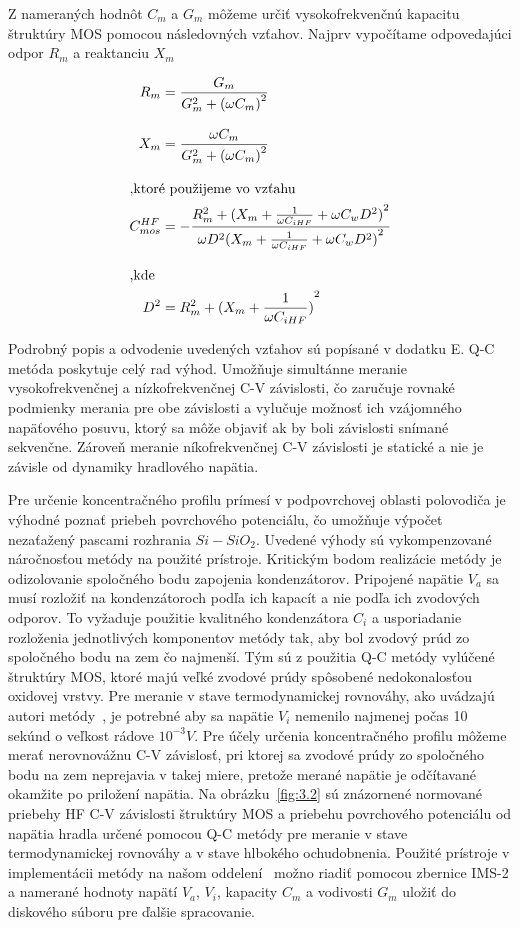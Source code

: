 Z nameraných hodnôt $C_m$ a $G_m$ môžeme určiť vysokofrekvenčnú
kapacitu štruktúry MOS pomocou následovných vzťahov.  Najprv
vypočítame odpovedajúci odpor $R_m$ a reaktanciu $X_m$

\begin{subequations}\label{eq:3.3}
  \begin{align}
    R_m &= \frac{G_m}{G^2_m + {(\omega C_m)}^2}\label{eq:3.3a}\\[0.3cm]
    X_m &= \frac{\omega C_m}{G^2_m + {(\omega C_m)}^2}\label{eq:3.3b}\\[0.3cm]
    \intertext{,ktoré použijeme vo vzťahu}
    C^{HF}_{mos} &= - \cfrac{R^2_m + {(X_m + \frac{1}{\omega C_{iHF}} + \omega C_w D^2)}^2}{\omega D^2{(X_m + \frac{1}{\omega C_{iHF}} + \omega C_{w} D^2)}^2}\label{eq:3.3c}\\[0.3cm]
    \intertext{,kde}
    D^2 &= R^2_m + {(X_m + \frac{1}{\omega C_{iHF}})}^2\label{eq:3.3d}
  \end{align}
\end{subequations}

Podrobný popis a odvodenie uvedených vzťahov sú popísané v dodatku
E\@. Q-C metóda poskytuje celý rad výhod.  Umožňuje simultánne meranie
vysokofrekvenčnej a nízkofrekvenčnej C-V závislosti, čo zaručuje
rovnaké podmienky merania pre obe závislosti a vylučuje možnosť ich
vzájomného napäťového posuvu, ktorý sa môže objaviť ak by boli
závislosti snímané sekvenčne. Zároveň meranie níkofrekvenčnej C-V
závislosti je statické a nie je závisle od dynamiky hradlového
napätia.

Pre určenie koncentračného profilu prímesí v podpovrchovej oblasti
polovodiča je výhodné poznať priebeh povrchového potenciálu, čo
umožňuje výpočet nezaťažený pascami rozhrania $Si-SiO_2$. Uvedené
výhody sú vykompenzované náročnosťou metódy na použité prístroje.
Kritickým bodom realizácie metódy je odizolovanie spoločného bodu
zapojenia kondenzátorov. Pripojené napätie $V_a$ sa musí rozložiť na
kondenzátoroch podľa ich kapacít a nie podľa ich zvodových odporov.
To vyžaduje použitie kvalitného kondenzátora $C_i$ a usporiadanie
rozloženia jednotlivých komponentov metódy tak, aby bol zvodový prúd
zo spoločného bodu na zem čo najmenší. Tým sú z použitia Q-C metódy
vylúčené štruktúry MOS, ktoré majú veľké zvodové prúdy spôsobené
nedokonalosťou oxidovej vrstvy. Pre meranie v stave termodynamickej
rovnováhy, ako uvádzajú autori metódy~\cite{3.7}, je potrebné aby sa
napätie $V_i$ nemenilo najmenej počas 10 sekúnd o veľkost rádove
$10^{-3}V$. Pre účely určenia koncentračného profilu môžeme merať
nerovnovážnu C-V závislosť, pri ktorej sa zvodové prúdy zo spoločného
bodu na zem neprejavia v takej miere, pretože merané napätie je
odčítavané okamžite po priložení napätia. Na obrázku~\ref{fig:3.2} sú
znázornené normované priebehy HF C-V závislosti štruktúry MOS a
priebehu povrchového potenciálu od napätia hradla určené pomocou Q-C
metódy pre meranie v stave termodynamickej rovnováhy a v stave
hlbokého ochudobnenia. Použité prístroje v implementácii metódy na
našom oddelení~\cite{3.8,3.9} možno riadiť pomocou zbernice IMS-2 a
namerané hodnoty napätí $V_a$, $V_i$, kapacity $C_m$ a vodivosti $G_m$
uložiť do diskového súboru pre ďalšie spracovanie.

